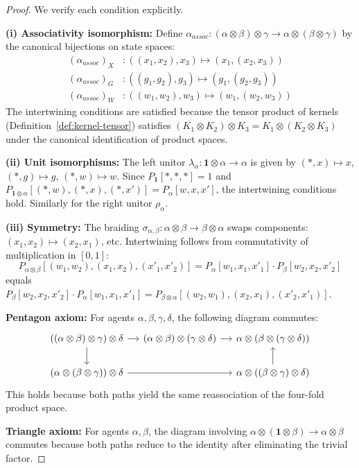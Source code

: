 \documentclass[11pt,a4paper]{article}
\theoremstyle{definition}
\theoremstyle{plain}
\theoremstyle{remark}
\begin{document}
\begin{proof}
We verify each condition explicitly.

\textbf{(i) Associativity isomorphism:} Define $\alpha_{assoc}: (\alpha \otimes \beta) \otimes \gamma \to \alpha \otimes (\beta \otimes \gamma)$ by the canonical bijections on state spaces:
\begin{align*}
(\alpha_{assoc})_X&: ((x_1, x_2), x_3) \mapsto (x_1, (x_2, x_3)) \\
(\alpha_{assoc})_G&: ((g_1, g_2), g_3) \mapsto (g_1, (g_2, g_3)) \\
(\alpha_{assoc})_W&: ((w_1, w_2), w_3) \mapsto (w_1, (w_2, w_3))
\end{align*}
The intertwining conditions are satisfied because the tensor product of kernels (Definition~\ref{def:kernel-tensor}) satisfies $(K_1 \otimes K_2) \otimes K_3 = K_1 \otimes (K_2 \otimes K_3)$ under the canonical identification of product spaces.

\textbf{(ii) Unit isomorphisms:} The left unitor $\lambda_\alpha: \mathbf{1} \otimes \alpha \to \alpha$ is given by $(*, x) \mapsto x$, $(*, g) \mapsto g$, $(*, w) \mapsto w$. Since $P_{\mathbf{1}}[*, *, *] = 1$ and $P_{\mathbf{1} \otimes \alpha}[(*, w), (*, x), (*, x')] = P_\alpha[w, x, x']$, the intertwining conditions hold. Similarly for the right unitor $\rho_\alpha$.

\textbf{(iii) Symmetry:} The braiding $\sigma_{\alpha,\beta}: \alpha \otimes \beta \to \beta \otimes \alpha$ swaps components: $(x_1, x_2) \mapsto (x_2, x_1)$, etc. Intertwining follows from commutativity of multiplication in $[0,1]$:
\[
P_{\alpha \otimes \beta}[(w_1, w_2), (x_1, x_2), (x'_1, x'_2)] = P_\alpha[w_1, x_1, x'_1] \cdot P_\beta[w_2, x_2, x'_2]
\]
equals $P_\beta[w_2, x_2, x'_2] \cdot P_\alpha[w_1, x_1, x'_1] = P_{\beta \otimes \alpha}[(w_2, w_1), (x_2, x_1), (x'_2, x'_1)]$.

\textbf{Pentagon axiom:} For agents $\alpha, \beta, \gamma, \delta$, the following diagram commutes:
\[
\begin{tikzcd}[column sep=small]
((\alpha \otimes \beta) \otimes \gamma) \otimes \delta \arrow[r] \arrow[d] & (\alpha \otimes \beta) \otimes (\gamma \otimes \delta) \arrow[r] & \alpha \otimes (\beta \otimes (\gamma \otimes \delta)) \\
(\alpha \otimes (\beta \otimes \gamma)) \otimes \delta \arrow[rr] & & \alpha \otimes ((\beta \otimes \gamma) \otimes \delta) \arrow[u]
\end{tikzcd}
\]
This holds because both paths yield the same reassociation of the four-fold product space.

\textbf{Triangle axiom:} For agents $\alpha, \beta$, the diagram involving $\alpha \otimes (\mathbf{1} \otimes \beta) \to \alpha \otimes \beta$ commutes because both paths reduce to the identity after eliminating the trivial factor.
\end{proof}
\end{document}
